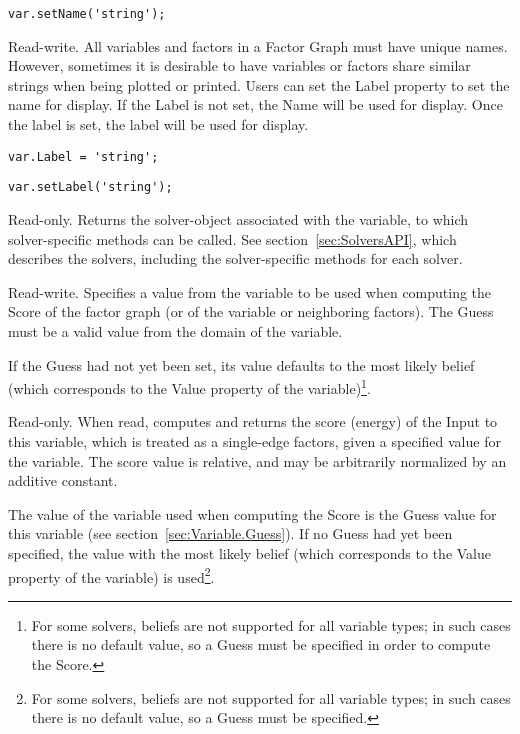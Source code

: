 \fi

\ifjava
\begin{lstlisting}
var.setName('string');
\end{lstlisting}

\fi


Read-write. All variables and factors in a Factor Graph must have unique names. However, sometimes it is desirable to have variables or factors share similar strings when being plotted or printed. Users can set the Label property to set the name for display. If the Label is not set, the Name will be used for display. Once the label is set, the label will be used for display.

\ifmatlab
\begin{lstlisting}
var.Label = 'string';
\end{lstlisting}
\fi

\ifjava
\begin{lstlisting}
var.setLabel('string');
\end{lstlisting}
\fi



Read-only.  Returns the solver-object associated with the variable, to which solver-specific methods can be called.  See section~\ref{sec:SolversAPI}, which describes the solvers, including the solver-specific methods for each solver.

\label{sec:Variable.Guess}

Read-write.  Specifies a value from the variable to be used when computing the Score of the factor graph (or of the variable or neighboring factors).  The Guess must be a valid value from the domain of the variable.

If the Guess had not yet been set, its value defaults to the most likely belief (which corresponds to the Value property of the variable)\footnote{For some solvers, beliefs are not supported for all variable types; in such cases there is no default value, so a Guess must be specified in order to compute the Score.}.


\label{sec:Variable.Score}

Read-only.  When read, computes and returns the score (energy) of the Input to this variable, which is treated as a single-edge factors, given a specified value for the variable.  The score value is relative, and may be arbitrarily normalized by an additive constant.

The value of the variable used when computing the Score is the Guess value for this variable (see section~\ref{sec:Variable.Guess}).  If no Guess had yet been specified, the value with the most likely belief (which corresponds to the Value property of the variable) is used\footnote{For some solvers, beliefs are not supported for all variable types; in such cases there is no default value, so a Guess must be specified.}.


